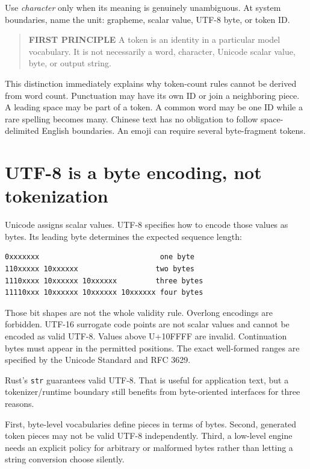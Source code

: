 Use \emph{character} only when its meaning is genuinely unambiguous. At
system boundaries, name the unit: grapheme, scalar value, UTF-8 byte, or
token ID.

\begin{quote}
\textbf{FIRST PRINCIPLE} A token is an identity in a particular model
vocabulary. It is not necessarily a word, character, Unicode scalar
value, byte, or output string.
\end{quote}

This distinction immediately explains why token-count rules cannot be
derived from word count. Punctuation may have its own ID or join a
neighboring piece. A leading space may be part of a token. A common word
may be one ID while a rare spelling becomes many. Chinese text has no
obligation to follow space-delimited English boundaries. An emoji can
require several byte-fragment tokens.

\section{UTF-8 is a byte encoding, not
tokenization}\label{utf-8-is-a-byte-encoding-not-tokenization}

Unicode assigns scalar values. UTF-8 specifies how to encode those
values as bytes. Its leading byte determines the expected sequence
length:

\begin{verbatim}
0xxxxxxx                            one byte
110xxxxx 10xxxxxx                  two bytes
1110xxxx 10xxxxxx 10xxxxxx         three bytes
11110xxx 10xxxxxx 10xxxxxx 10xxxxxx four bytes
\end{verbatim}

Those bit shapes are not the whole validity rule. Overlong encodings are
forbidden. UTF-16 surrogate code points are not scalar values and cannot
be encoded as valid UTF-8. Values above U+10FFFF are invalid.
Continuation bytes must appear in the permitted positions. The exact
well-formed ranges are specified by the Unicode Standard and RFC 3629.

Rust's \texttt{str} guarantees valid UTF-8. That is useful for
application text, but a tokenizer/runtime boundary still benefits from
byte-oriented interfaces for three reasons.

First, byte-level vocabularies define pieces in terms of bytes. Second,
generated token pieces may not be valid UTF-8 independently. Third, a
low-level engine needs an explicit policy for arbitrary or malformed
bytes rather than letting a string conversion choose silently.

